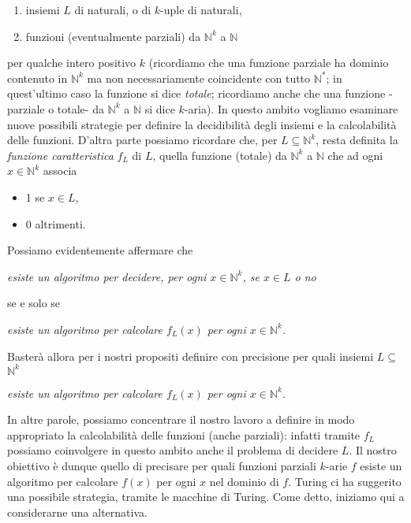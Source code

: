 \begin{enumerate}
    \item insiemi $L$ di naturali, o di $k$-uple di naturali,
    \item funzioni (eventualmente parziali) da $\mathbb{N}^k$ a $\mathbb{N}$
\end{enumerate}

per qualche intero positivo $k$ (ricordiamo che una funzione parziale ha dominio
contenuto in $\mathbb{N}^k$ ma non necessariamente coincidente con tutto
$\mathbb{N}^*$; in quest'ultimo caso la funzione si dice \textit{totale}; ricordiamo
anche che una funzione -parziale o totale- da $\mathbb{N}^k$ a $\mathbb{N}$ si
dice $k$-aria). In questo ambito vogliamo esaminare nuove possibili strategie
per definire la decidibilità degli insiemi e la calcolabilità delle funzioni.
D'altra parte possiamo ricordare che, per $L \subseteq \mathbb{N}^k$, resta
definita la \textit{funzione caratteristica} $f_L$ di $L$, quella funzione (totale) da
$\mathbb{N}^k$ a $\mathbb{N}$ che ad ogni $x \in \mathbb{N}^k$ associa

\begin{itemize}
    \item 1 se $x \in L$,
    \item 0 altrimenti.
\end{itemize}

Possiamo evidentemente affermare che

\begin{center}
    \textit{esiste un algoritmo
        per decidere, per ogni $x \in \mathbb{N}^k$, se $x \in L$ o no}
\end{center}

se e solo se

\begin{center}
    \textit{esiste un algoritmo per calcolare $f_L(x)$ per ogni $x \in \mathbb{N}^k$.}
\end{center}

Basterà allora per i nostri propositi definire con precisione per quali insiemi
$L \subseteq$ $\mathbb{N}^k$

\begin{center}
    \textit{esiste un algoritmo per calcolare $f_L(x)$ per ogni
        $x \in \mathbb{N}^k$.}
\end{center}

In altre parole, possiamo concentrare il nostro lavoro a
definire in modo appropriato la calcolabilità delle funzioni (anche parziali):
infatti tramite $f_L$ possiamo coinvolgere in questo ambito anche il problema di
decidere $L$. Il nostro obiettivo è dunque quello di precisare per quali
funzioni parziali $k$-arie $f$ esiste un algoritmo per calcolare $f(x)$ per ogni
$x$ nel dominio di $f$. Turing ci ha suggerito una possibile strategia, tramite
le macchine di Turing. Come detto, iniziamo qui a considerarne una alternativa.

